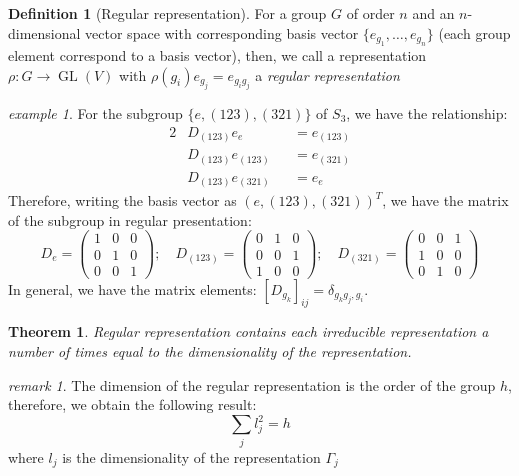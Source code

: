\documentclass{amsart}
\newtheorem*{theorem}{Theorem}
\theoremstyle{remark}
\newtheorem*{remark}{remark}
\theoremstyle{remark}
\newtheorem*{example}{example}
\theoremstyle{definition}
\newtheorem*{definition}{Definition}
\DeclareMathOperator{\GL}{GL}
\begin{document}
\begin{definition}
    [Regular representation]
    For a group $G$ of order $n$ and an $n$-dimensional vector space with corresponding basis vector 
    $\{e_{g_1},\dots,e_{g_n}\}$ (each group element correspond to a basis vector), then, 
    we call a representation $\rho\colon G\to \GL(V)$ with $\rho(g_i) e_{g_j} = e_{g_i g_j}$
    a \emph{regular representation}
\end{definition}
\begin{example}
For the subgroup $\{e, (123), (321)\}$ of $S_3$, we have the relationship:
\begin{alignat*}{2}
    &D_{(123)} e_e &&= e_{(123)} \\
    &D_{(123)} e_{(123)} &&= e_{(321)} \\
    &D_{(123)} e_{(321)} &&= e_{e}
\end{alignat*}
Therefore, writing the basis vector as $(e, (123), (321))^T$, we have the matrix of the subgroup
in regular presentation:
\begin{equation*}
    D_{e} = \left(\begin{matrix}
        1 & 0 & 0 \\
        0 & 1 & 0 \\
        0 & 0 & 1 
    \end{matrix}\right);\quad D_{(123)} = \left(\begin{matrix}
        0 & 1 & 0 \\
        0 & 0 & 1 \\
        1 & 0 & 0 
    \end{matrix}\right);\quad D_{(321)} = \left(\begin{matrix}
        0 & 0 & 1 \\
        1 & 0 & 0 \\
        0 & 1 & 0 
    \end{matrix}\right)
\end{equation*}
In general, we have the matrix elements: $\left[D_{g_k}\right]_{ij} = \delta_{g_k g_j, g_i}$.
\end{example}

\begin{theorem}
    Regular representation contains each irreducible representation a number of times equal
    to the dimensionality of the representation.
\end{theorem}
\begin{remark}
    The dimension of the regular representation is the order of the group $h$, therefore, we obtain 
    the following result:
    \begin{equation*}
        \sum_j l_j^2 = h
    \end{equation*}
    where $l_j$ is the dimensionality of the representation $\Gamma_j$
\end{remark}

\newpage
\end{document}
